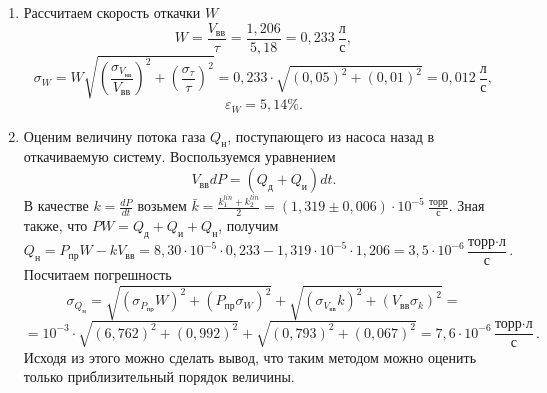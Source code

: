 \documentclass[a4paper]{article}
\begin{document}
\begin{enumerate}
\item Рассчитаем скорость откачки $W$
\begin{equation*}
    W = \frac{V_\text{вв}}{\tau} = \frac{1,206}{5,18} = 0,233 \ \frac{\text{л}}{\text{с}},
\end{equation*}
\begin{equation*}
    \sigma_W =  W \sqrt{\left(\frac{\sigma_{V_\text{вв}}}{V_\text{вв}}\right)^2 +\left(\frac{\sigma_{\tau}}{\tau}\right)^2} = 0,233 \cdot \sqrt{\left( 0,05\right)^2 + \left(0,01\right)^2} = 0,012 \ \frac{\text{л}}{\text{с}},
\end{equation*}
\begin{equation*}
    \varepsilon_W =  5,14 \%.
\end{equation*}

\item Оценим величину потока газа $Q_{\text{н}}$, поступающего из насоса назад в откачиваемую систему. Воспользуемся уравнением
\begin{equation*}
      V_{\text{вв}}dP = (Q_\text{д} + Q_\text{и})dt.
\end{equation*}
В качестве $k = \frac{dP}{dt}$ возьмем $\bar{k}= \frac{k_1^{lin} + k_2^{lin}}{2} = (1,319 \pm 0,006) \cdot 10^{-5} \ \frac{\text{торр}}{\text{с}}$. Зная также, что $PW = Q_\text{д} + Q_\text{и} + Q_\text{н}$, получим
\begin{equation*}
      Q_\text{н} = P_{\text{пр}} W - k V_{\text{вв}} = 8,30 \cdot 10^{-5} \cdot 0,233 - 1,319 \cdot 10^{-5} \cdot 1,206 = 3,5 \cdot 10^{-6} \frac{\text{торр} \cdot \text{л}}{\text{с}}.
\end{equation*}
Посчитаем погрешность
\begin{equation*}
      \sigma_{Q_\text{н}} = \sqrt{\left(\sigma_{P_{\text{пр}}} W\right)^2 + \left({P_{\text{пр}}} \sigma_W\right)^2} + \sqrt{\left(\sigma_{V_{\text{вв}}} k\right)^2 + \left({V_{\text{вв}}} \sigma_k\right)^2} =
\end{equation*}
\begin{equation*}
= 10^{-3} \cdot \sqrt{\left(6,762\right)^2 + \left(0,992\right)^2} + \sqrt{\left(0,793\right)^2 + \left(0,067\right)^2} = 7,6 \cdot 10^{-6} \frac{\text{торр} \cdot \text{л}}{\text{с}}.
\end{equation*}
Исходя из этого можно сделать вывод, что таким методом можно оценить только приблизительный порядок величины.


\end{enumerate}
\end{document}
